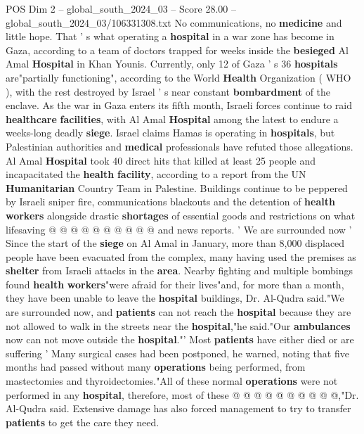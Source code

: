 \begin{textsample}{POS Dim 2 – global\_south\_2024\_03 – Score 28.00 – global\_south\_2024\_03/106331308.txt}  \label{ex:f2_pos_007}
No communications, no \textbf{medicine} and little hope.
That ' s what operating a \textbf{hospital} in a war zone has become in Gaza, according to a team of doctors trapped for weeks inside the \textbf{besieged} Al Amal \textbf{Hospital} in Khan Younis.
Currently, only 12 of Gaza ' s 36 \textbf{hospitals} are"partially functioning", according to the World \textbf{Health} Organization ( WHO ), with the rest destroyed by Israel ' s near constant \textbf{bombardment} of the enclave.
As the war in Gaza enters its fifth month, Israeli forces continue to raid \textbf{healthcare} \textbf{facilities}, with Al Amal \textbf{Hospital} among the latest to endure a weeks-long deadly \textbf{siege}.
Israel claims Hamas is operating in \textbf{hospitals}, but Palestinian authorities and \textbf{medical} professionals have refuted those allegations.
Al Amal \textbf{Hospital} took 40 direct hits that killed at least 25 people and incapacitated the \textbf{health} \textbf{facility}, according to a report from the UN \textbf{Humanitarian} Country Team in Palestine.
Buildings continue to be peppered by Israeli sniper fire, communications blackouts and the detention of \textbf{health} \textbf{workers} alongside drastic \textbf{shortages} of essential goods and restrictions on what lifesaving @ @ @ @ @ @ @ @ @ @ and news reports. ' We are surrounded now ' Since the start of the \textbf{siege} on Al Amal in January, more than 8,000 displaced people have been evacuated from the complex, many having used the premises as \textbf{shelter} from Israeli attacks in the \textbf{area}.
Nearby fighting and multiple bombings found \textbf{health} \textbf{workers}"were afraid for their lives"and, for more than a month, they have been unable to leave the \textbf{hospital} buildings, Dr.
Al-Qudra said."We are surrounded now, and \textbf{patients} can not reach the \textbf{hospital} because they are not allowed to walk in the streets near the \textbf{hospital},"he said."Our \textbf{ambulances} now can not move outside the \textbf{hospital}."' Most \textbf{patients} have either died or are suffering ' Many surgical cases had been postponed, he warned, noting that five months had passed without many \textbf{operations} being performed, from mastectomies and thyroidectomies."All of these normal \textbf{operations} were not performed in any \textbf{hospital}, therefore, most of these @ @ @ @ @ @ @ @ @ @,"Dr.
Al-Qudra said.
Extensive damage has also forced management to try to transfer \textbf{patients} to get the care they need.

\end{textsample}
